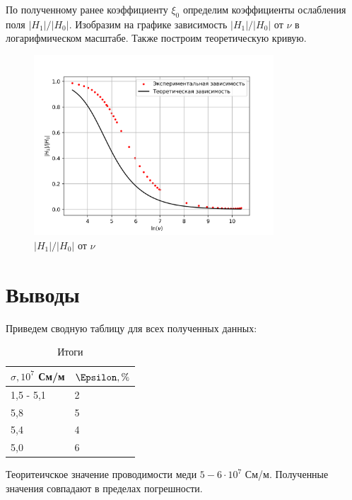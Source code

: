 \documentclass[a4paper, 12pt]{article}
\begin{document}
По полученному ранее коэффициенту $\xi_0$ определим коэффициенты ослабления поля $ |H_1|/|H_0|$. 
Изобразим на графике зависимость $ |H_1|/|H_0|$ от  $\nu$ в логарифмическом масштабе. Также построим теоретическую кривую.
\begin{figure}[H]
    \centering
    \includegraphics[width=0.8\textwidth]{Hlnnu.png}
    \caption{$|H_1|/|H_0|$ от  $\nu$}
    \label{fig:gln}
\end{figure}

\section{Выводы}
Приведем сводную таблицу для всех полученных данных:
\begin{table}[H]
	\centering
	\begin{tabular}{|l|l|}
	\hline
	$\sigma, 10^7$ См/м & $\Epsilon, \%$ \\ \hline
	1,5 - 5,1           & 2              \\ \hline
	5,8                 & 5              \\ \hline
	5,4                 & 4              \\ \hline
	5,0                 & 6              \\ \hline
	\end{tabular}
	\caption{Итоги}
	\label{tab:itogi}
	\end{table}
Теоритеичское значение проводимости меди $5-6 \cdot 10^7$ См/м. Полученные значения совпадают в пределах погрешности.
\end{document}
